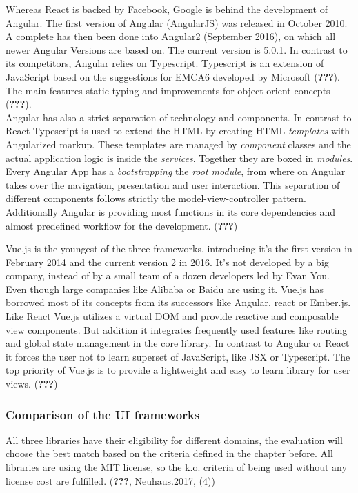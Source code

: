 \documentclass[american,a4paper,oneside,,tablecaptionabove]{scrbook}
\begin{document}
Whereas React is backed by Facebook, Google is behind the development of
Angular. The first version of Angular (AngularJS) was released in
October 2010. A complete has then been done into Angular2 (September
2016), on which all newer Angular Versions are based on. The current
version is 5.0.1. In contrast to its competitors, Angular relies on
Typescript. Typescript is an extension of JavaScript based on the
suggestions for EMCA6 developed by Microsoft ({\textbf{???}}). The main
features static typing and improvements for object orient concepts
({\textbf{???}}).\\
Angular has also a strict separation of technology and components. In
contrast to React Typescript is used to extend the HTML by creating HTML
\emph{templates} with Angularized markup. These templates are managed by
\emph{component} classes and the actual application logic is inside the
\emph{services}. Together they are boxed in \emph{modules}. Every
Angular App has a \emph{bootstrapping} the \emph{root module}, from
where on Angular takes over the navigation, presentation and user
interaction. This separation of different components follows strictly
the model-view-controller pattern. Additionally Angular is providing
most functions in its core dependencies and almost predefined workflow
for the development. ({\textbf{???}})

Vue.js is the youngest of the three frameworks, introducing it's the
first version in February 2014 and the current version 2 in 2016. It's
not developed by a big company, instead of by a small team of a dozen
developers led by Evan You. Even though large companies like Alibaba or
Baidu are using it. Vue.js has borrowed most of its concepts from its
successors like Angular, react or Ember.js. Like React Vue.js utilizes a
virtual DOM and provide reactive and composable view components. But
addition it integrates frequently used features like routing and global
state management in the core library. In contrast to Angular or React it
forces the user not to learn superset of JavaScript, like JSX or
Typescript. The top priority of Vue.js is to provide a lightweight and
easy to learn library for user views. ({\textbf{???}})

\subsubsection{Comparison of the UI
frameworks}\label{comparison-of-the-ui-frameworks}

All three libraries have their eligibility for different domains, the
evaluation will choose the best match based on the criteria defined in
the chapter before. All libraries are using the MIT license, so the k.o.
criteria of being used without any license cost are fulfilled.
({\textbf{???}}, Neuhaus.2017, (4))
\end{document}
